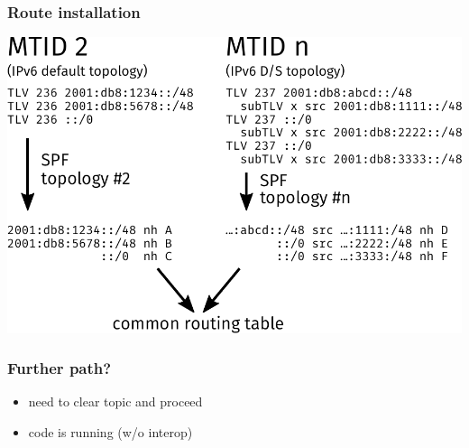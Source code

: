 \documentclass[12pt]{beamer}
\begin{document}
\begin{frame}
  \frametitle{Route installation}
  \begin{center}
    \includegraphics[scale=0.65,angle=0]{isis_93_mtmerge.pdf}%
  \end{center}
\end{frame}

\begin{frame}
  \frametitle{Further path?}
  \begin{itemize}
    \item need to clear topic and proceed
    \item code is running (w/o interop)
  \end{itemize}
\end{frame}
\end{document}
